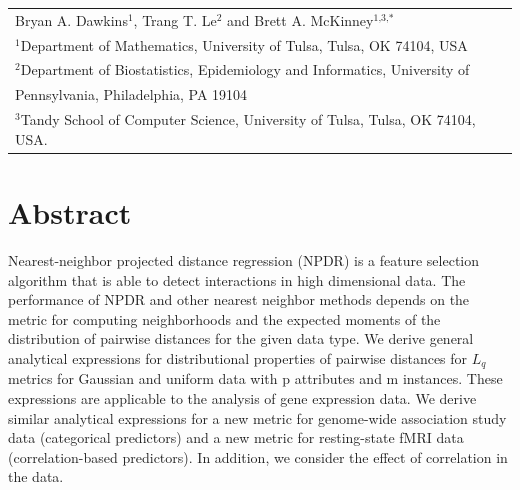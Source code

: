 \documentclass[10pt,letterpaper]{article}\usepackage[]{graphicx}\usepackage[]{color}
\begin{document}
\vspace*{0.2in}

{\Large
\textbf{} %
}
\begin{center}
  \begin{tabular}{l}
  Bryan A. Dawkins$^{\text{1}}$, Trang T. Le$^{\text{2}}$ and Brett A. McKinney$^{\text{1,3,}*}$ \\
  $^{\text{1}}$Department of Mathematics, University of Tulsa, Tulsa, OK 74104, USA \\
  $^{\text{2}}$Department of Biostatistics, Epidemiology and Informatics, University of \\
  \hphantom{2}Pennsylvania, Philadelphia, PA 19104 \\
  $^{\text{3}}$Tandy School of Computer Science, University of Tulsa, Tulsa, OK 74104, USA.
  \end{tabular}
\end{center}


\section*{Abstract}
Nearest-neighbor projected distance regression (NPDR) is a feature selection algorithm that is able to detect interactions in high dimensional data. The performance of NPDR and other nearest neighbor methods depends on the metric for computing neighborhoods and the expected moments of the distribution of pairwise distances for the given data type. We derive general analytical expressions for distributional properties of pairwise distances for $L_q$ metrics for Gaussian and uniform data with p attributes and m instances. These expressions are applicable to the analysis of gene expression data. We derive similar analytical expressions for a new metric for genome-wide association study data (categorical predictors) and a new metric for resting-state fMRI data (correlation-based predictors). In addition, we consider the effect of correlation in the data.
\end{document}
